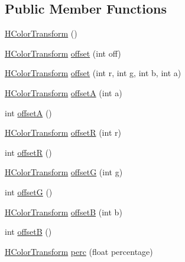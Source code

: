 \subsection*{Public Member Functions}
\begin{DoxyCompactItemize}
\item 
\hyperlink{classhype_1_1colorist_1_1_h_color_transform_a19ba4182cc31366e7475bdda401d5498}{H\-Color\-Transform} ()
\item 
\hyperlink{classhype_1_1colorist_1_1_h_color_transform}{H\-Color\-Transform} \hyperlink{classhype_1_1colorist_1_1_h_color_transform_acd4d43acffc9a4dff98aebf6b82ca18e}{offset} (int off)
\item 
\hyperlink{classhype_1_1colorist_1_1_h_color_transform}{H\-Color\-Transform} \hyperlink{classhype_1_1colorist_1_1_h_color_transform_a76b7cd2f14a2d6110682471f6a11a11c}{offset} (int r, int g, int b, int a)
\item 
\hyperlink{classhype_1_1colorist_1_1_h_color_transform}{H\-Color\-Transform} \hyperlink{classhype_1_1colorist_1_1_h_color_transform_a692ad7e0140da93052a0c692a5bd6caa}{offset\-A} (int a)
\item 
int \hyperlink{classhype_1_1colorist_1_1_h_color_transform_acd1631ba50be29390b4e06e79428dc8c}{offset\-A} ()
\item 
\hyperlink{classhype_1_1colorist_1_1_h_color_transform}{H\-Color\-Transform} \hyperlink{classhype_1_1colorist_1_1_h_color_transform_adf864f74b1252845ee7754267da3fdd2}{offset\-R} (int r)
\item 
int \hyperlink{classhype_1_1colorist_1_1_h_color_transform_a22244bd5c15dd3885e50eeb8aff0a70f}{offset\-R} ()
\item 
\hyperlink{classhype_1_1colorist_1_1_h_color_transform}{H\-Color\-Transform} \hyperlink{classhype_1_1colorist_1_1_h_color_transform_a95cf59b9f89f632db349241118e62048}{offset\-G} (int g)
\item 
int \hyperlink{classhype_1_1colorist_1_1_h_color_transform_a3b9c281c94a68061672fc717ae38ec09}{offset\-G} ()
\item 
\hyperlink{classhype_1_1colorist_1_1_h_color_transform}{H\-Color\-Transform} \hyperlink{classhype_1_1colorist_1_1_h_color_transform_a53f24039d82544d399be752872e54291}{offset\-B} (int b)
\item 
int \hyperlink{classhype_1_1colorist_1_1_h_color_transform_a1bf96a7fd90a82fd525c39cb2056cd4b}{offset\-B} ()
\item 
\hyperlink{classhype_1_1colorist_1_1_h_color_transform}{H\-Color\-Transform} \hyperlink{classhype_1_1colorist_1_1_h_color_transform_ab953912cc198f1a14ee3a3cf9133ff6f}{perc} (float percentage)

\end{DoxyCompactItemize}
